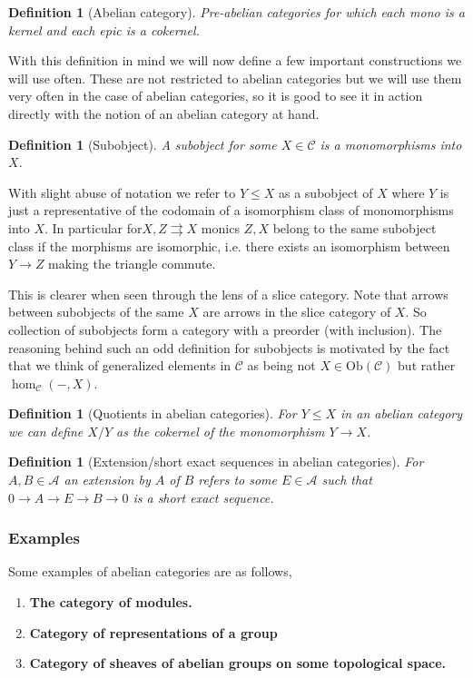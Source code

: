 \documentclass[12pt]{article}
\numberwithin{equation}{section}
\newcounter{dummy} \numberwithin{dummy}{section}
\newtheorem{definition}[dummy]{Definition}
\begin{document}
\begin{appendices}
	
	\begin{definition}[Abelian category]
		Pre-abelian categories for which each mono is a kernel and each epic is a cokernel.
	\end{definition}
	
	With this definition in mind we will now define a few important constructions we will use often. These are not restricted to abelian categories but we will use them very often in the case of abelian categories, so it is good to see it in action directly with the notion of an abelian category at hand.
	\begin{definition}[Subobject]
			A subobject for some $X \in \mathcal{C}$ is a monomorphisms into $X$. 
	\end{definition}
	
	
	With slight abuse of notation we refer to $Y \leq X$ as a subobject of $X$ where $Y$ is just a representative of the codomain of a isomorphism class of monomorphisms into $X$. In particular for$X, Z \rightrightarrows X$ monics $Z, X$ belong to the same subobject class if the morphisms are isomorphic, i.e. there exists an isomorphism between $Y \to Z$ making the triangle commute. 
	
	This is clearer when seen through the lens of a slice category. Note that arrows between subobjects of the same $X$ are arrows in the slice category of $X$. So collection of subobjects form a category with a preorder (with inclusion). The reasoning behind such an odd definition for subobjects is motivated by the fact that we think of generalized elements in $\mathcal{C} $ as being not $X \in \mathrm{Ob}(\mathcal{C}) $ but rather $\hom_\mathcal{C}(-,X)$.
	
	\begin{definition}[Quotients in abelian categories]
		For $Y \leq X$ in an abelian category we can define $X/Y $ as the cokernel of the monomorphism $Y \to X$. 
	\end{definition}
	
	\begin{definition}[Extension/short exact sequences in abelian categories]
		For $ A, B \in \mathcal{A}$ an extension by $A$ of $B$ refers to some $E \in \mathcal{A}$ such that $0 \to A \to E \to B \to 0$ is a short exact sequence.
	\end{definition}
	
	\subsubsection{Examples}
	Some examples of abelian categories are as follows,
	\begin{enumerate}
		\item \textbf{The category of modules.}
		\item\textbf{Category of representations of a group}
		\item \textbf{Category of sheaves of abelian groups on some topological space.}
		

\end{enumerate}
\end{appendices}
\end{document}
